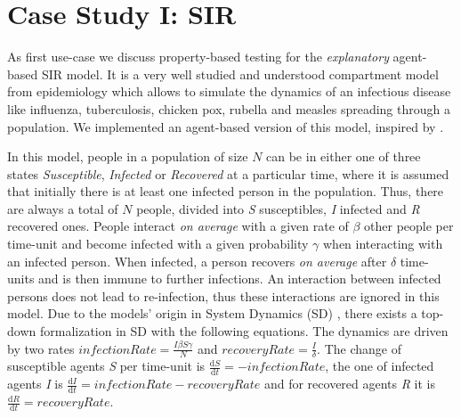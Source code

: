 \section{Case Study I: SIR}
\label{sec:case_SIR}
As first use-case we discuss property-based testing for the \textit{explanatory} agent-based SIR model. It is a very well studied and understood compartment model from epidemiology \cite{kermack_contribution_1927} which allows to simulate the dynamics of an infectious disease like influenza, tuberculosis, chicken pox, rubella and measles spreading through a population. We implemented an agent-based version of this model, inspired by \cite{macal_agent-based_2010}. %

In this model, people in a population of size $N$ can be in either one of three states \textit{Susceptible}, \textit{Infected} or \textit{Recovered} at a particular time, where it is assumed that initially there is at least one infected person in the population. Thus, there are always a total of $N$ people, divided into \textit{S} susceptibles, \textit{I} infected and \textit{R} recovered ones. People interact \textit{on average} with a given rate of $\beta$ other people per time-unit and become infected with a given probability $\gamma$ when interacting with an infected person. When infected, a person recovers \textit{on average} after $\delta$ time-units and is then immune to further infections. An interaction between infected persons does not lead to re-infection, thus these interactions are ignored in this model. Due to the models' origin in System Dynamics (SD) \cite{porter_industrial_1962}, there exists a top-down formalization in SD with the following equations. The dynamics are driven by two rates $infectionRate = \frac{I \beta S \gamma}{N}$ and $recoveryRate = \frac{I}{\delta}$. The change of susceptible agents \textit{S} per time-unit is $\frac{\mathrm d S}{\mathrm d t} = -infectionRate$, the one of infected agents \textit{I} is $\frac{\mathrm d I}{\mathrm d t} = infectionRate - recoveryRate$ and for recovered agents \textit{R} it is $\frac{\mathrm d R}{\mathrm d t} = recoveryRate$.

